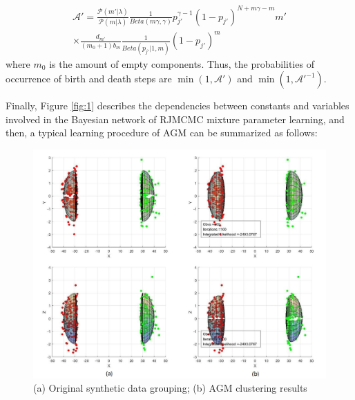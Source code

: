 \documentclass[conference]{IEEEtran}
\begin{document}
\begin{multline}
\mathcal{A}'=\frac{\mathcal{P}(m'|\lambda)}{\mathcal{P}(m|\lambda)}\frac{1}{Beta(m\gamma,\gamma)}p_{j'}^{\gamma-1}(1-p_{j'})^{N+m\gamma-m}m' \\
\times \frac{d_{m'}}{(m_0+1)b_m}\frac{1}{Beta(p_{j'}|1,m)}(1-p_{j'})^m\qquad\quad
\label{eq:acptProBD}
\end{multline}
where $m_0$ is the amount of empty components. Thus, the probabilities of occurrence of birth and death steps are $\min(1,\mathcal{A}')$ and $\min(1,\mathcal{A}'^{-1})$\cite{Richardson1997}.

Finally, Figure \ref{fig:1} describes the dependencies between constants and variables involved in the Bayesian network of RJMCMC mixture parameter learning, and then, a typical learning procedure of AGM can be summarized as follows:
\bigskip


\begin{figure}[b]
\centering
\includegraphics[width=0.4\paperwidth]{xyzMerge.jpg}
\caption{(a) Original synthetic data grouping; (b) AGM clustering results}
\label{fig:2}
\end{figure}
\end{document}
